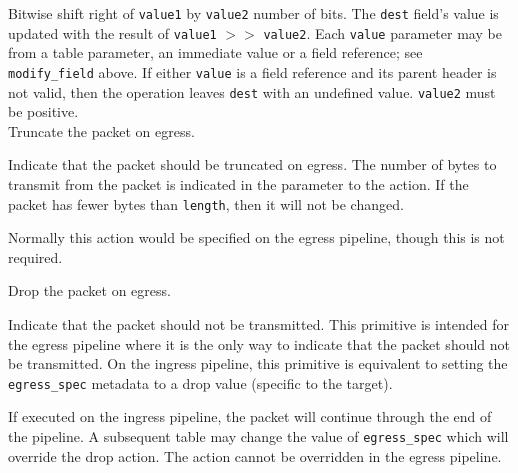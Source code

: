 \documentclass[12pt]{article}
\begin{document}

{ %
Bitwise shift right of \texttt{value1} by \texttt{value2} number of bits.
}
{ %
}
{ %
The \texttt{dest} field's value is updated with the result of 
\texttt{value1} $>>$ \texttt{value2}. Each \texttt{value} parameter may be from a
table parameter, an immediate value or a field reference; see \texttt{modify_field} above. If either \texttt{value}
is a field reference and its parent header is not valid, then the operation
leaves \texttt{dest} with an undefined value. \texttt{value2} must be positive.
}\\


{ %
Truncate the packet on egress.
}
{ %
}
{ %
Indicate that the packet should be truncated on egress.  The number of bytes 
to transmit from the packet is indicated in the parameter to the action.  If 
the packet has fewer bytes than \texttt{length}, then it will not be changed.

Normally this action would be specified on the egress pipeline, though this 
is not required.
}


{ %
Drop the packet on egress.
}
{ %
}
{ %
Indicate that the packet should not be transmitted. This primitive is intended 
for the egress pipeline where it is the only way to indicate that the packet 
should not be transmitted. On the ingress pipeline, this primitive is equivalent 
to setting the \texttt{egress_spec} metadata to a drop value (specific to the target). 


If executed on the ingress pipeline, the packet will continue through the 
end of the pipeline. A subsequent table may change the value of \texttt{egress_spec} which 
will override the drop action. The action cannot be overridden in the egress 
pipeline.
}

\end{document}
